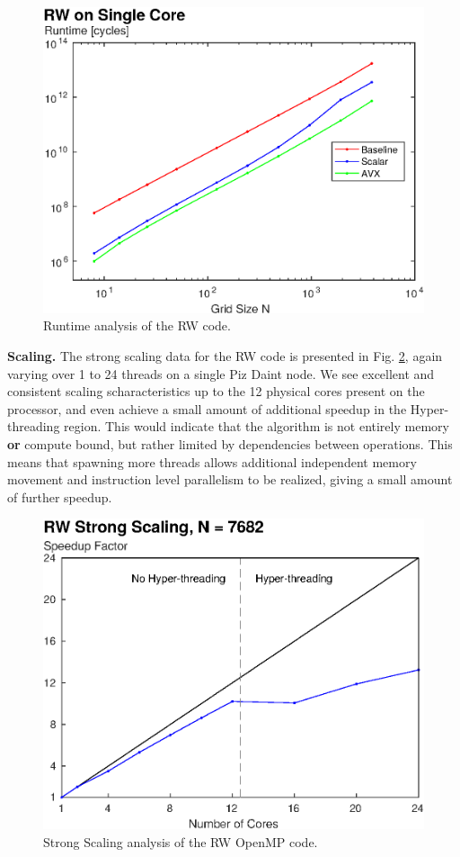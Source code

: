 \documentclass[letterpaper]{article}
\newcommand{\mypar}[1]{{\bf #1.}}
\begin{document}
\begin{figure}\centering
  \includegraphics[width=\linewidth]{./plots/runtime_RW.eps}
  \caption{Runtime analysis of the RW code.}
  \label{fig:runtime_RW}
\end{figure}

\mypar{Scaling}
The strong scaling data for the RW code is presented in Fig. \ref{fig:scaling_strong_RW}, again varying over 1 to 24 threads on a single Piz Daint node. We see excellent and consistent scaling scharacteristics up to the 12 physical cores present on the processor, and even achieve a small amount of additional speedup in the Hyper-threading region. This would indicate that the algorithm is not entirely memory \textbf{or} compute bound, but rather limited by dependencies between operations. This means that spawning more threads allows additional independent memory movement and instruction level parallelism to be realized, giving a small amount of further speedup.

\begin{figure}\centering
  \includegraphics[width=\linewidth]{./plots/scaling_strong_RW.eps}
  \caption{Strong Scaling analysis of the RW OpenMP code.}
  \label{fig:scaling_strong_RW}
\end{figure}
\end{document}
